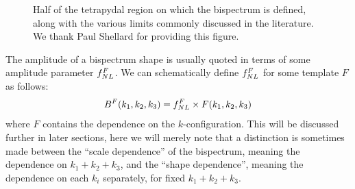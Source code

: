 \begin{figure}[h!]
\centering
\caption{
    Half of the tetrapydal region on which the bispectrum is defined,
    along with the various limits commonly discussed in the literature.
    We thank Paul Shellard for providing this figure.
}\label{fig:tetrapyd_diagram}
\end{figure}


The amplitude of a bispectrum shape is usually
quoted in terms of some amplitude parameter $f_{NL}^F$.
We can schematically define $f_{NL}^F$ for some template $F$ as follows:
\begin{equation}\label{def:fnl}
{
B^{F}(k_1,k_2,k_3) = f_{NL}^{F}\times F(k_1,k_2,k_3)
}
\end{equation}
where $F$ contains the dependence on the $k$-configuration.
This will be discussed further in later sections,
here we will merely note
that a distinction is sometimes made between the ``scale dependence''
of the bispectrum, meaning the dependence on $k_1+k_2+k_3$, and the ``shape dependence'',
meaning the dependence on each $k_i$ separately, for fixed $k_1+k_2+k_3$.


